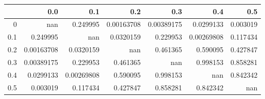 \begin{tabular}{rrrrrrr}
\toprule
     &          0.0 &          0.1 &          0.2 &          0.3 &          0.4 &        0.5 \\
\midrule
 0   & nan          &   0.249995   &   0.00163708 &   0.00389175 &   0.0299133  &   0.003019 \\
 0.1 &   0.249995   & nan          &   0.0320159  &   0.229953   &   0.00269808 &   0.117434 \\
 0.2 &   0.00163708 &   0.0320159  & nan          &   0.461365   &   0.590095   &   0.427847 \\
 0.3 &   0.00389175 &   0.229953   &   0.461365   & nan          &   0.998153   &   0.858281 \\
 0.4 &   0.0299133  &   0.00269808 &   0.590095   &   0.998153   & nan          &   0.842342 \\
 0.5 &   0.003019   &   0.117434   &   0.427847   &   0.858281   &   0.842342   & nan        \\
\bottomrule
\end{tabular}